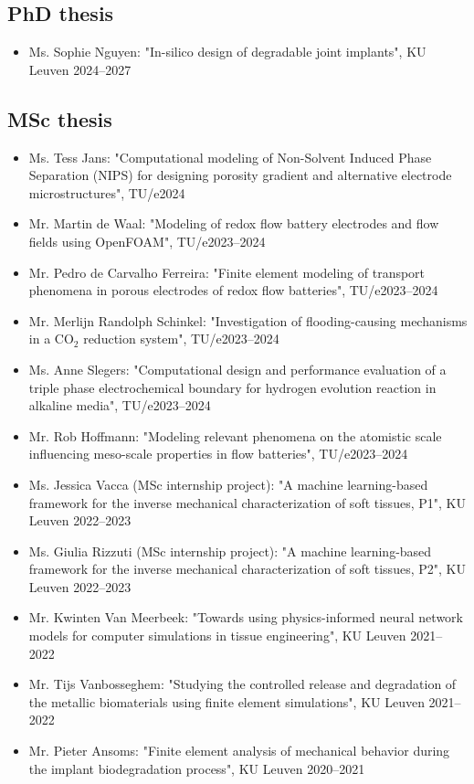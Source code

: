 \documentclass{cv}
\begin{document}
\subsection{PhD thesis}

\begin{itemize}[itemsep=-0.2ex]
\item
Ms. Sophie Nguyen: "In-silico design of degradable joint implants", KU Leuven \hfill 2024--2027
\end{itemize}

\subsection{MSc thesis}

\begin{itemize}[itemsep=-0.2ex]
\item
Ms. Tess Jans: "Computational modeling of Non-Solvent Induced Phase Separation (NIPS) for designing porosity gradient and alternative electrode microstructures", TU/e\hfill 2024
\item
Mr. Martin de Waal: "Modeling of redox flow battery electrodes and flow fields using OpenFOAM", TU/e\hfill 2023--2024
\item
Mr. Pedro de Carvalho Ferreira: "Finite element modeling of transport phenomena in porous electrodes of redox flow batteries", TU/e\hfill 2023--2024
\item
Mr. Merlijn Randolph Schinkel: "Investigation of flooding-causing
mechanisms in a $\textrm{CO}_2$ reduction system", TU/e\hfill 2023--2024
\item
Ms. Anne Slegers: "Computational design and performance evaluation of a triple phase electrochemical boundary for hydrogen evolution reaction in alkaline media", TU/e\hfill 2023--2024
\item
Mr. Rob Hoffmann: "Modeling relevant phenomena on the atomistic scale influencing meso-scale properties in flow batteries", TU/e\hfill 2023--2024
\item
Ms. Jessica Vacca (MSc internship project): "A machine learning-based framework for the inverse mechanical characterization of soft tissues, P1", KU Leuven \hfill 2022--2023
\item
Ms. Giulia Rizzuti (MSc internship project): "A machine learning-based framework for the inverse mechanical characterization of soft tissues, P2", KU Leuven \hfill 2022--2023
\item 
Mr. Kwinten Van Meerbeek: "Towards using physics-informed neural network models for computer simulations in tissue engineering", KU Leuven \hfill 2021--2022
\item 
Mr. Tijs Vanbosseghem: "Studying the controlled release and
degradation of the metallic biomaterials using finite element simulations", KU Leuven \hfill 2021--2022
\item 
Mr. Pieter Ansoms: "Finite element analysis of mechanical behavior during the implant biodegradation process", KU Leuven \hfill 2020--2021
\end{itemize}
\end{document}
